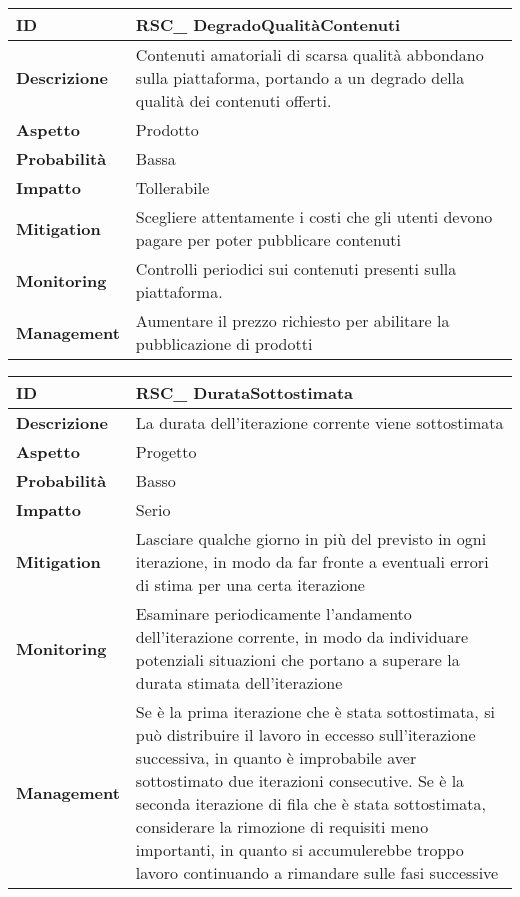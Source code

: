 \begin{tabular}{|p{2.2cm}|p{9.6cm}| } 
 	\hline
	 \textbf{ID} & RSC\_ DegradoQualitàContenuti\\ [0.5ex] 
	\hline
	\textbf{Descrizione} & Contenuti amatoriali di scarsa qualità abbondano sulla piattaforma, portando a un degrado della qualità dei contenuti offerti. \\ 
	\hline
   	\textbf{Aspetto} &  Prodotto \\
	\hline
	\textbf{Probabilità} &  Bassa \\ 
	\hline
	\textbf{Impatto} &  Tollerabile \\ 
	\hline
	\textbf{Mitigation} & Scegliere attentamente i costi che gli utenti devono pagare per poter pubblicare contenuti \\ 
	\hline
	\textbf{Monitoring} & Controlli periodici sui contenuti presenti sulla piattaforma. \\ 
	\hline
	\textbf{Management} &  Aumentare il prezzo richiesto per abilitare la pubblicazione di prodotti \\ 
	\hline
\end{tabular}


\begin{tabular}{|p{2.2cm}|p{9.6cm}| }
 	\hline
	\textbf{ID} & RSC\_ DurataSottostimata\\ [0.5ex] 
	\hline
	\textbf{Descrizione} & La durata dell'iterazione corrente viene sottostimata \\ 
	\hline
	\textbf{Aspetto} &  Progetto \\
	\hline
	\textbf{Probabilità} & Basso\\ 
	\hline
	\textbf{Impatto} & Serio\\
	\hline
	\textbf{Mitigation} & Lasciare qualche giorno in più del previsto in ogni iterazione, in modo da far fronte a eventuali errori di stima per una certa iterazione\\ 
	\hline
	\textbf{Monitoring} & Esaminare periodicamente l'andamento dell'iterazione corrente, in modo da individuare potenziali situazioni che portano a superare la durata stimata dell'iterazione\\ 
	\hline
	\textbf{Management} & Se è la prima iterazione che è stata sottostimata, si può distribuire il lavoro in eccesso sull'iterazione successiva, in quanto è improbabile aver sottostimato due iterazioni consecutive. Se è la seconda iterazione di fila che è stata sottostimata, considerare la rimozione di requisiti meno importanti, in quanto si accumulerebbe troppo lavoro continuando a rimandare sulle fasi successive \\ 
	\hline
\end{tabular}


